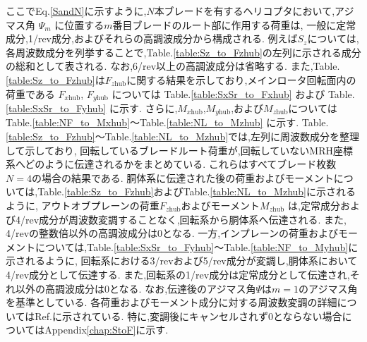     ここでEq.\eqref{SandN}に示すように,$N$本ブレードを有するヘリコプタにおいて,アジマス角 $\Psi_m$ に位置する$m$番目ブレードのルート部に作用する荷重は,
    一般に定常成分,1/rev成分,およびそれらの高調波成分から構成される.
    例えば$S_z$については,各周波数成分を列挙することで,Table.\ref{table:Sz_to_Fzhub}の左列に示される成分の総和として表される.
    なお,6/rev以上の高調波成分は省略する.
    また,Table.\ref{table:Sz_to_Fzhub}は$F_{z\mathrm{hub}}$に関する結果を示しており,メインロータ回転面内の荷重である
    $F_{x\mathrm{hub}}$, $F_{y\mathrm{hub}}$ については Table.\ref{table:SxSr_to_Fxhub} および Table.\ref{table:SxSr_to_Fyhub} に示す.
    さらに,$M_{x\mathrm{hub}}$,$M_{y\mathrm{hub}}$,および$M_{z\mathrm{hub}}$についてはTable.\ref{table:NF_to_Mxhub}～Table.\ref{table:NL_to_Mzhub} に示す.
    Table.\ref{table:Sz_to_Fzhub}～Table.\ref{table:NL_to_Mzhub}では,左列に周波数成分を整理して示しており,
    回転しているブレードルート荷重が,回転していないMRH座標系へどのように伝達されるかをまとめている.
    これらはすべてブレード枚数$N=4$の場合の結果である.
    胴体系に伝達された後の荷重およびモーメントについては,Table.\ref{table:Sz_to_Fzhub}およびTable.\ref{table:NL_to_Mzhub}に示されるように,
    アウトオブプレーンの荷重$F_{z\mathrm{hub}}$およびモーメント$M_{z\mathrm{hub}}$ は,定常成分および4/rev成分が周波数変調することなく,回転系から胴体系へ伝達される.
    また, 4/revの整数倍以外の高調波成分は0となる.
    一方,インプレーンの荷重およびモーメントについては,Table.\ref{table:SxSr_to_Fyhub}～Table.\ref{table:NF_to_Myhub}に示されるように,
    回転系における3/revおよび5/rev成分が変調し,胴体系において4/rev成分として伝達する.
    また,回転系の1/rev成分は定常成分として伝達され,それ以外の高調波成分は0となる.
    なお,伝達後のアジマス角$\Psi$は$m=1$のアジマス角を基準としている.
    各荷重およびモーメント成分に対する周波数変調の詳細についてはRef.\cite{johnson_2013}に示されている.
    特に,変調後にキャンセルされず0とならない場合についてはAppendix\ref{chap:StoF}に示す.


